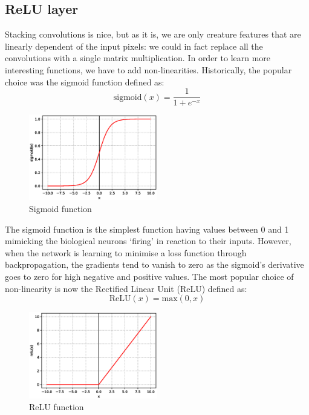 \subsection{ReLU layer}
Stacking convolutions is nice, but as it is, we are only creature features that are linearly dependent of the input pixels: we could in fact replace all the convolutions with a single matrix multiplication. In order to learn more interesting functions, we have to add non-linearities. Historically, the popular choice was the sigmoid function defined as:
\begin{equation}
\text{sigmoid}(x) = \frac{1}{1+e^{-x}}
\end{equation}

\begin{figure}[H]
\centering
\includegraphics[width=0.5\textwidth]{Images/sigmoid.eps}
\caption{Sigmoid function}
\end{figure}

The sigmoid function is the simplest function having values between 0 and 1 mimicking the biological neurons `firing' in reaction to their inputs. However, when the network is learning to minimise a loss function through backpropagation, the gradients tend to vanish to zero as the sigmoid's derivative goes to zero for high negative and positive values. The most popular choice of non-linearity is now the Rectified Linear Unit (ReLU) defined as:
\begin{equation}
\text{ReLU}(x) = \text{max}(0,x)
\end{equation}

\begin{figure}[H]
\centering
\includegraphics[width=0.5\textwidth]{Images/relu.eps}
\caption{ReLU function}
\end{figure}

